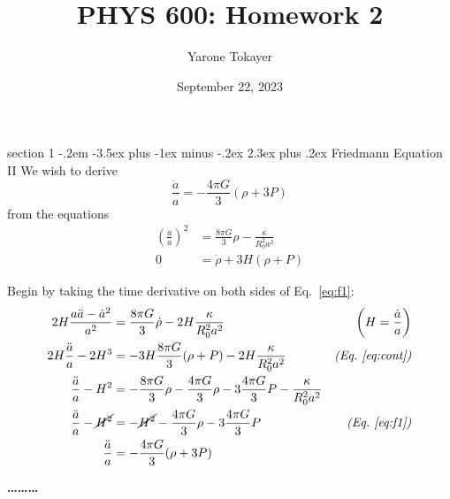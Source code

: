 \documentclass[12pt]{article}
\makeatletter
\newenvironment{problem}{\@startsection
	{section}
	{1}
	{-.2em}
	{-3.5ex plus -1ex minus -.2ex}
	{2.3ex plus .2ex}
	{\pagebreak[3]%
		\large\bf\noindent{Problem }
	}
}
{%
	\begin{center}\large\bf \ldots\ldots\ldots\end{center}}
\makeatother
\begin{document}
	
	\title{PHYS 600: Homework 2}
	\author{Yarone Tokayer}
	\date{September 22, 2023}
	
	\maketitle
	
	\thispagestyle{empty}

	\begin{problem}{Friedmann Equation II}
		We wish to derive \begin{equation} \label{eq:f2}
			\frac{\ddot{a}}{a} = -\frac{4\pi G}{3}(\rho + 3P)
		\end{equation} from the equations \begin{align}
			\left(\frac{\dot{a}}{a}\right)^2 &= \frac{8\pi G}{3}\rho - \frac{\kappa}{R_0^2a^2} \label{eq:f1}
			\\
			0 &= \dot{\rho} + 3H(\rho+P) \label{eq:cont}
		\end{align}
		
		Begin by taking the time derivative on both sides of Eq.~\ref{eq:f1}: \begin{align*}
			2 H \frac{a\ddot{a} - \dot{a}^2}{a^2} &= \frac{8\pi G}{3}\dot{\rho} - 2 H \frac{\kappa}{R_0^2a^2} & \textit{$\left(H = \frac{\dot{a}}{a}\right)$}
			\\
			2H \frac{\ddot{a}}{a} - 2H^3 &= -3H \frac{8\pi G}{3}(\rho + P) - 2 H \frac{\kappa}{R_0^2a^2}  & \textit{(Eq.~\ref{eq:cont})}
			\\
			\frac{\ddot{a}}{a} - H^2 &= -\frac{8\pi G}{3}\rho - \frac{4\pi G}{3}\rho -3 \frac{4\pi G}{3} P -  \frac{\kappa}{R_0^2a^2}
			\\
			\frac{\ddot{a}}{a} - \cancel{H^2} &= -\cancel{H^2} - \frac{4\pi G}{3}\rho -3 \frac{4\pi G}{3} P & \textit{(Eq.~\ref{eq:f1})}
			\\
			\frac{\ddot{a}}{a} &= -\frac{4\pi G}{3}(\rho + 3P)
		\end{align*}
	
	\end{problem}
	
\end{document}
